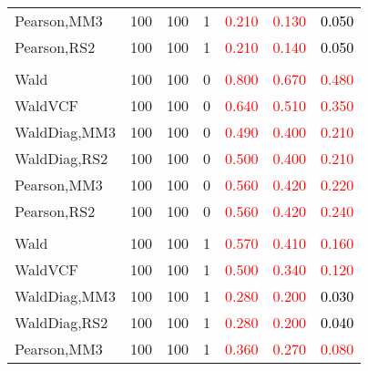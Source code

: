 \documentclass[
]{article}
\begin{document}
\begin{table}[H]
{\begin{tabular}[t]{lrrrrrr}
\hspace{1em}Pearson,MM3 & 100 & 100 & 1 & \textcolor{red}{0.210} & \textcolor{red}{0.130} & \textcolor{black}{0.050}\\
\hspace{1em}Pearson,RS2 & 100 & 100 & 1 & \textcolor{red}{0.210} & \textcolor{red}{0.140} & \textcolor{black}{0.050}\\
\addlinespace[0.3em]
\multicolumn{7}{l}{\textbf{1F 15V}}\\
\hspace{1em}Wald & 100 & 100 & 0 & \textcolor{red}{0.800} & \textcolor{red}{0.670} & \textcolor{red}{0.480}\\
\hspace{1em}WaldVCF & 100 & 100 & 0 & \textcolor{red}{0.640} & \textcolor{red}{0.510} & \textcolor{red}{0.350}\\
\hspace{1em}WaldDiag,MM3 & 100 & 100 & 0 & \textcolor{red}{0.490} & \textcolor{red}{0.400} & \textcolor{red}{0.210}\\
\hspace{1em}WaldDiag,RS2 & 100 & 100 & 0 & \textcolor{red}{0.500} & \textcolor{red}{0.400} & \textcolor{red}{0.210}\\
\hspace{1em}Pearson,MM3 & 100 & 100 & 0 & \textcolor{red}{0.560} & \textcolor{red}{0.420} & \textcolor{red}{0.220}\\
\hspace{1em}Pearson,RS2 & 100 & 100 & 0 & \textcolor{red}{0.560} & \textcolor{red}{0.420} & \textcolor{red}{0.240}\\
\addlinespace[0.3em]
\multicolumn{7}{l}{\textbf{2F 10V}}\\
\hspace{1em}Wald & 100 & 100 & 1 & \textcolor{red}{0.570} & \textcolor{red}{0.410} & \textcolor{red}{0.160}\\
\hspace{1em}WaldVCF & 100 & 100 & 1 & \textcolor{red}{0.500} & \textcolor{red}{0.340} & \textcolor{red}{0.120}\\
\hspace{1em}WaldDiag,MM3 & 100 & 100 & 1 & \textcolor{red}{0.280} & \textcolor{red}{0.200} & \textcolor{black}{0.030}\\
\hspace{1em}WaldDiag,RS2 & 100 & 100 & 1 & \textcolor{red}{0.280} & \textcolor{red}{0.200} & \textcolor{black}{0.040}\\
\hspace{1em}Pearson,MM3 & 100 & 100 & 1 & \textcolor{red}{0.360} & \textcolor{red}{0.270} & \textcolor{red}{0.080}\\

\end{tabular}}
\end{table}
\end{document}
